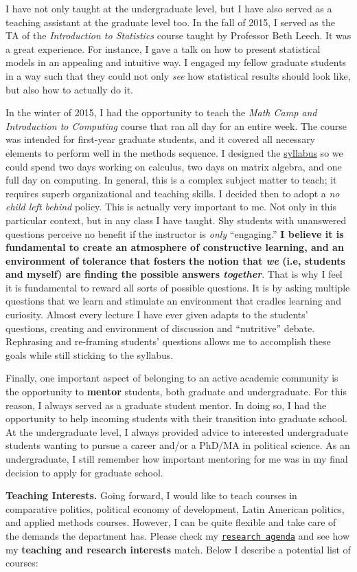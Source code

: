 I have not only taught at the undergraduate level, but I have also served as a teaching assistant at the graduate level too. In the fall of 2015, I served as the TA of the \emph{Introduction to Statistics} course taught by Professor Beth Leech. It was a great experience. For instance, I gave a talk on how to present statistical models in an appealing and intuitive way. I engaged my fellow graduate students in a way such that they could not only \emph{see} how statistical results should look like, but also how to actually do it. 

In the winter of 2015, I had the opportunity to teach the \emph{Math Camp and Introduction to Computing} course that ran all day for an entire week. The course was intended for first-year graduate students, and it covered all necessary elements to perform well in the methods sequence. I designed the \href{https://github.com/hbahamonde/Math-Camp/raw/master/Syllabus/Math_Camp_Syllabus.pdf}{syllabus} so we could spend two days working on calculus, two days on matrix algebra, and one full day on computing. In general, this is a complex subject matter to teach; it requires superb organizational and teaching skills. I decided then to adopt a \emph{no child left behind} policy. This is actually very important to me. Not only in this particular context, but in any class I have taught. Shy students with unanswered questions perceive no benefit if the instructor is \emph{only} ``engaging.'' {\bf I believe it is fundamental to create an atmosphere of constructive learning, and an environment of tolerance that fosters the notion that \emph{we} (i.e, students and myself) are finding the possible answers \emph{together}}. That is why I feel it is fundamental to reward all sorts of possible questions. It is by asking multiple questions that we learn and stimulate an environment that cradles learning and curiosity. Almost every lecture I have ever given adapts to the students' questions, creating and environment of discussion and ``nutritive'' debate. Rephrasing and re-framing students' questions allows me to accomplish these goals while still sticking to the syllabus. 

Finally, one important aspect of belonging to an active academic community is the opportunity to {\bf mentor} students, both graduate and undergraduate. For this reason, I always served as a graduate student mentor. In doing so, I had the opportunity to help incoming students with their transition into graduate school. At the undergraduate level, I always provided advice to interested undergraduate students wanting to pursue a career and/or a PhD/MA in political science. As an undergraduate, I still remember how important mentoring for me was in my final decision to apply for graduate school.

{\bf Teaching Interests.} Going forward, I would like to teach courses in comparative politics, political economy of development, Latin American politics, and applied methods courses. However, I can be quite flexible and take care of the demands the department has. Please check my \href{http://www.hectorbahamonde.com/research/}{\texttt{research agenda}} and see how my {\bf teaching and research interests} match. Below I describe a potential list of courses:
